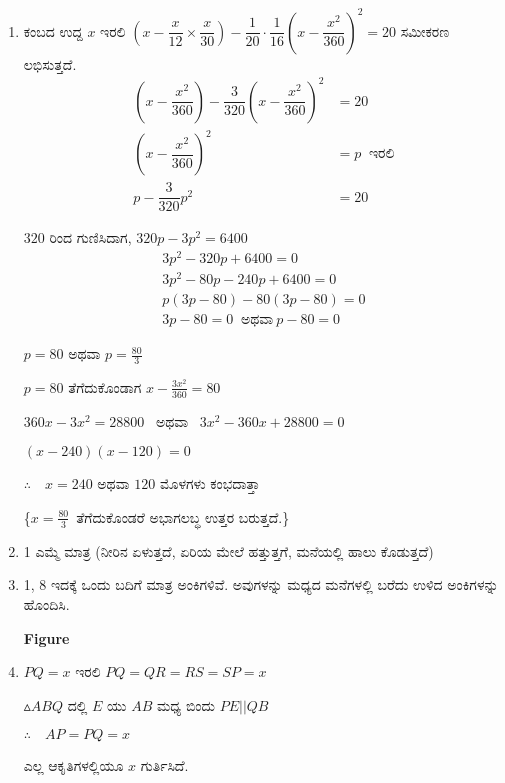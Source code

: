 \begin{enumerate}
\item ಕಂಬದ ಉದ್ದ $x$ ಇರಲಿ $\left(x - \dfrac{x}{12} \times \dfrac{x}{30}\right) - \dfrac{1}{20} \cdot \dfrac{1}{16} \left(x - \dfrac{x^{2}}{360}\right)^{2} = 20$ ಸಮೀಕರಣ ಲಭಿಸುತ್ತದೆ. 
\begin{align*}
\left(x - \dfrac{x^{2}}{360}\right) - \dfrac{3}{320} \left(x - \dfrac{x^{2}}{360}\right)^{2} & = 20\\
\left(x - \dfrac{x^{2}}{360}\right)^{2} & = p ~\text{ ಇರಲಿ}\\
p - \dfrac{3}{320} p^{2} & = 20
\end{align*}

$320$ ರಿಂದ ಗುಣಿಸಿದಾಗ, $320p - 3p^{2} = 6400$
\begin{gather*}
3p^{2} - 320p + 6400 = 0\\
3p^{2} - 80p - 240p + 6400 = 0\\
p(3p - 80) - 80 (3p - 80) = 0\\
3p - 80 = 0 \ \text{ ಅಥವಾ}\ p - 80 = 0
\end{gather*}

$p = 80$ ಅಥವಾ $p = \frac{80}{3}$

$p = 80$ ತೆಗೆದುಕೊಂಡಾಗ $x - \frac{3x^{2}}{360} = 80$

$360x - 3x^{2} = 28800$ \ ಅಥವಾ \ $3x^{2} - 360x + 28800 = 0$

$(x - 240) (x - 120) = 0$

$\therefore\quad x = 240$ ಅಥವಾ $120$ ಮೊಳಗಳು ಕಂಭದಾತ್ತಾ 

\{$x = \frac{80}{3}$\ ತೆಗೆದುಕೊಂಡರೆ ಅಭಾಗಲಬ್ಧ ಉತ್ತರ ಬರುತ್ತದೆ.\}

\item 1 ಎಮ್ಮೆ ಮಾತ್ರ (ನೀರಿನ ಏಳುತ್ತದೆ, ಏರಿಯ ಮೇಲೆ ಹತ್ತುತ್ತಗೆ, ಮನೆಯಲ್ಲಿ ಹಾಲು ಕೊಡುತ್ತದೆ)

\item 1, 8 ಇದಕ್ಕೆ ಒಂದು ಬದಿಗೆ ಮಾತ್ರ ಅಂಕಿಗಳಿವೆ. ಅವುಗಳನ್ನು ಮಧ್ಯದ ಮನೆಗಳಲ್ಲಿ ಬರೆದು ಉಳಿದ ಅಂಕಿಗಳನ್ನು ಹೊಂದಿಸಿ. 

\begin{center}
{\bf Figure}
\end{center}

\item $PQ = x$ ಇರಲಿ  $PQ = QR = RS = SP = x$

$\vartriangle ABQ$ ದಲ್ಲಿ  $E$ ಯು $AB$ ಮಧ್ಯ ಬಿಂದು $PE ||  QB$

$\therefore\quad AP = PQ = x$

ಎಲ್ಲ ಆಕೃತಿಗಳಲ್ಲಿಯೂ $x$ ಗುರ್ತಿಸಿದೆ.  


\end{enumerate}
